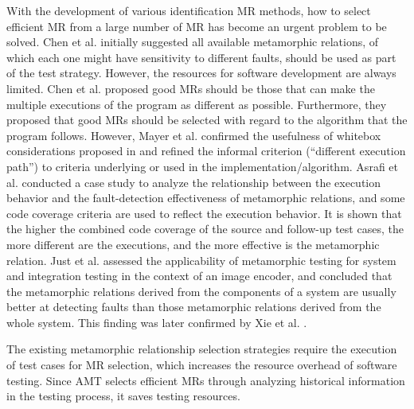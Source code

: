\documentclass[10pt,journal,compsoc]{IEEEtran}
\begin{document}
With the development of various identification MR methods, how to select efficient MR from a large number of MR has become an urgent problem to be solved.
Chen et al. \cite{chen2004metamorphic} initially suggested all available metamorphic relations, of which each one might have sensitivity to different faults, should be used as part of the test strategy. 
However, the resources for software development are always limited. 
Chen et al. \cite{chen2004case} proposed good MRs should be those that can make the multiple executions of the program as different as possible. Furthermore, they proposed that good MRs should be selected with regard to the algorithm that the program follows. 
However, Mayer et al. confirmed the usefulness of whitebox considerations proposed in \cite{chen2004case} and refined the informal criterion (``different execution path'') to criteria underlying or used in the implementation/algorithm. Asrafi et al. \cite{asrafi2011testing} conducted a case study to analyze the relationship between the execution behavior and the fault-detection effectiveness of metamorphic relations, and some code coverage criteria are used to reflect the execution behavior. It is shown that the higher the combined code coverage of the source and follow-up test cases, the more different are the executions, and the more effective is the metamorphic relation. 
Just et al. \cite{Just2010Automating} assessed the applicability of metamorphic testing for system and integration testing in the context of an image encoder, and concluded that the metamorphic relations derived from the components of a system are usually better at detecting faults than those metamorphic relations derived from the whole system. This finding was later confirmed by Xie et al. \cite{xie2014bottom}. 

The existing metamorphic relationship selection strategies require the execution of test cases for MR selection, which increases the resource overhead of software testing. Since AMT selects efficient MRs through analyzing historical information in the testing process, it saves testing resources.
\end{document}
